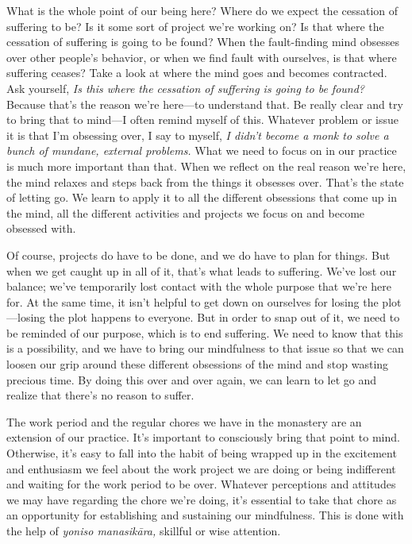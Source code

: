 What is the whole point of our being here? Where do we expect the 
cessation of suffering to be? Is it some sort of project we're working 
on? Is that where the cessation of suffering is going to be found? When 
the fault-finding mind obsesses over other people's behavior, or when 
we find fault with ourselves, is that where suffering ceases? Take a 
look at where the mind goes and becomes contracted. Ask yourself, 
\emph{Is this where the cessation of suffering is going to be found?} 
Because that's the reason we're here---to understand that. Be really 
clear and try to bring that to mind---I often remind myself of this. 
Whatever problem or issue it is that I'm obsessing over, I say to 
myself, \emph{I didn't become a monk to solve a bunch of mundane, 
external problems.} What we need to focus on in our practice is much 
more important than that. When we reflect on the real reason we're 
here, the mind relaxes and steps back from the things it obsesses over. 
That's the state of letting go. We learn to apply it to all the 
different obsessions that come up in the mind, all the different 
activities and projects we focus on and become obsessed with.

Of course, projects do have to be done, and we do have to plan for 
things. But when we get caught up in all of it, that's what leads to 
suffering. We've lost our balance; we've temporarily lost contact with 
the whole purpose that we're here for. At the same time, it isn't 
helpful to get down on ourselves for losing the plot---losing the plot 
happens to everyone. But in order to snap out of it, we need to be 
reminded of our purpose, which is to end suffering. We need to know 
that this is a possibility, and we have to bring our mindfulness to 
that issue so that we can loosen our grip around these different 
obsessions of the mind and stop wasting precious time. By doing this 
over and over again, we can learn to let go and realize that there's no 
reason to suffer.


The work period and the regular chores we have in the monastery are an 
extension of our practice. It's important to consciously bring that 
point to mind. Otherwise, it's easy to fall into the habit of being 
wrapped up in the excitement and enthusiasm we feel about the work 
project we are doing or being indifferent and waiting for the work 
period to be over. Whatever perceptions and attitudes we may have 
regarding the chore we're doing, it's essential to take that chore as 
an opportunity for establishing and sustaining our mindfulness. This is 
done with the help of \emph{yoniso manasikāra,} skillful or wise 
attention.

